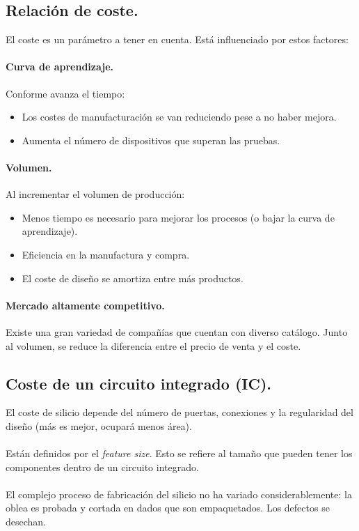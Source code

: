 \documentclass{article}
\begin{document}
\begin{multicols}{2}
		\subsection{Relación de coste.}
		El coste es un parámetro a tener en cuenta. Está influenciado por estos factores:
		\paragraph{Curva de aprendizaje.}
		Conforme avanza el tiempo: 
		\begin{itemize}
			\item Los costes de manufacturación se van reduciendo pese a no haber mejora.
			\item Aumenta el número de dispositivos que superan las pruebas.
		\end{itemize}
		\paragraph{Volumen.}
		Al incrementar el volumen de producción:
		\begin{itemize}
			\item Menos tiempo es necesario para mejorar los procesos (o bajar la curva de aprendizaje).
			\item Eficiencia en la manufactura y compra.
			\item El coste de diseño se amortiza entre más productos.
		\end{itemize}
		\paragraph{Mercado altamente competitivo.}
		Existe una gran variedad de compañías que cuentan con diverso catálogo. Junto al volumen, se reduce la diferencia entre el precio de venta y el coste.
		
		\subsection{Coste de un circuito integrado (IC).}
		El coste de silicio depende del número de puertas, conexiones y la regularidad del diseño (más es mejor, ocupará menos área).
		\paragraph{}
		Están definidos por el \textit{feature size}. Esto se refiere al tamaño que pueden tener los componentes dentro de un circuito integrado.
		\paragraph{}
		El complejo proceso de fabricación del silicio no ha variado considerablemente: la oblea es probada y cortada en dados que son empaquetados. Los defectos se desechan.
	

\end{multicols}
\end{document}
